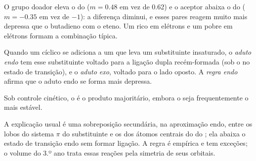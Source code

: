 O grupo doador eleva o  do  ($m = 0.48$ em vez de 0.62) e o aceptor
abaixa o  do  ($m = -0.35$ em vez de $-1$): a diferença diminui, e
esses pares reagem muito mais depressa que o butadieno com o eteno. Um 
rico em elétrons e um  pobre em elétrons formam a combinação típica.

\begin{definition}\label{def:b2:frontier-orbitals:endo}
Quando um  cíclico se adiciona a um  que leva um substituinte
insaturado, o \emph{aduto endo} tem esse substituinte voltado
para a ligação dupla recém-formada (sob o  no estado de transição), e o
\emph{aduto exo}, voltado para o lado oposto. A \emph{regra
endo} afirma que o aduto endo se forma mais depressa.
\end{definition}

\begin{proposition}\label{prop:b2:frontier-orbitals:endo}
Sob controle cinético, o  é o produto majoritário, embora o 
seja frequentemente o mais estável.
\end{proposition}

\admitted

A explicação usual é uma sobreposição secundária, na aproximação endo, entre os
lobos do sistema $\pi$ do substituinte e os dos átomos centrais do  do
; ela abaixa o estado de transição endo sem formar ligação. A regra é
empírica e tem exceções; o volume do 3.º ano trata essas reações pela simetria
de seus orbitais.

